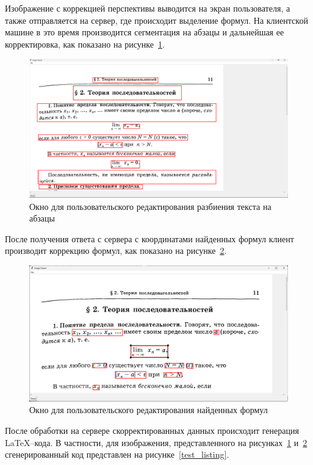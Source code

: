 Изображение с коррекцией перспективы выводится на экран пользователя, а также отправляется на сервер, где происходит выделение формул. На клиентской машине в это время производится сегментация на абзацы и дальнейшая ее корректировка, как показано на рисунке~\ref{paragraph_segmentation_window}.

\begin{figure}
    \includegraphics[scale=0.25]{img/app/paragraph_segmentation.png}
    \caption{Окно для пользовательского редактирования разбиения текста на абзацы}
    \label{paragraph_segmentation_window}
\end{figure}

После получения ответа с сервера с координатами найденных формул клиент производит коррекцию формул, как показано на рисунке~\ref{formula_editor_window}.

\begin{figure}
    \includegraphics[scale=0.25]{img/app/formula_editor_window.png}
    \caption{Окно для пользовательского редактирования найденных формул}
    \label{formula_editor_window}
\end{figure}

После обработки на сервере скорректированных данных происходит генерация \LaTeX--кода. В частности, для изображения, представленного на рисунках~\ref{paragraph_segmentation_window} и~\ref{formula_editor_window} сгенерированный код представлен на рисунке~\ref{test_listing}.

